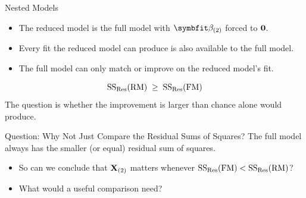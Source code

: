 \begin{frame}{Nested Models}
    \begin{itemize}
        \item The reduced model is the full model with $\bbeta_{(2)}$ forced to $\mathbf{0}$.
        \item Every fit the reduced model can produce is also available to the full model.
        \item The full model can only match or improve on the reduced model's fit.
    \end{itemize}
    \[
    \mathrm{SS}_{\mathrm{Res}}(\mathrm{RM}) \;\ge\; \mathrm{SS}_{\mathrm{Res}}(\mathrm{FM})
    \]
    The question is whether the improvement is larger than chance alone would produce.
\end{frame}


\begin{frame}{Question: Why Not Just Compare the Residual Sums of Squares?}
    The full model always has the smaller (or equal) residual sum of squares.
    \svspace{0.5em}
    \begin{itemize}
        \item So can we conclude that $\mathbf{X}_{(2)}$ matters whenever $\mathrm{SS}_{\mathrm{Res}}(\mathrm{FM})<\mathrm{SS}_{\mathrm{Res}}(\mathrm{RM})$?
        \item What would a useful comparison need?
    \end{itemize}
\end{frame}


